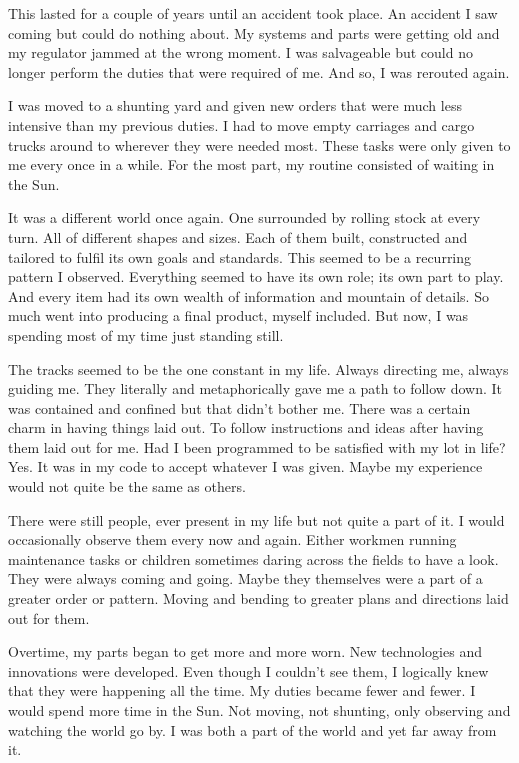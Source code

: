 This lasted for a couple of years until an accident took place. An accident I saw coming but could do nothing about. My systems and parts were getting old and my regulator jammed at the wrong moment. I was salvageable but could no longer perform the duties that were required of me. And so, I was rerouted again.

I was moved to a shunting yard and given new orders that were much less intensive than my previous duties. I had to move empty carriages and cargo trucks around to wherever they were needed most. These tasks were only given to me every once in a while. For the most part, my routine consisted of waiting in the Sun. 

It was a different world once again. One surrounded by rolling stock at every turn. All of different shapes and sizes. Each of them built, constructed and tailored to fulfil its own goals and standards. This seemed to be a recurring pattern I observed. Everything seemed to have its own role; its own part to play. And every item had its own wealth of information and mountain of details. So much went into producing a final product, myself included. But now, I was spending most of my time just standing still.

The tracks seemed to be the one constant in my life. Always directing me, always guiding me. They literally and metaphorically gave me a path to follow down. It was contained and confined but that didn't bother me. There was a certain charm in having things laid out. To follow instructions and ideas after having them laid out for me. Had I been programmed to be satisfied with my lot in life? Yes. It was in my code to accept whatever I was given. Maybe my experience would not quite be the same as others.

There were still people, ever present in my life but not quite a part of it. I would occasionally observe them every now and again. Either workmen running maintenance tasks or children sometimes daring across the fields to have a look. They were always coming and going. Maybe they themselves were a part of a greater order or pattern. Moving and bending to greater plans and directions laid out for them.

Overtime, my parts began to get more and more worn. New technologies and innovations were developed. Even though I couldn't see them, I logically knew that they were happening all the time. My duties became fewer and fewer. I would spend more time in the Sun. Not moving, not shunting, only observing and watching the world go by. I was both a part of the world and yet far away from it. 

